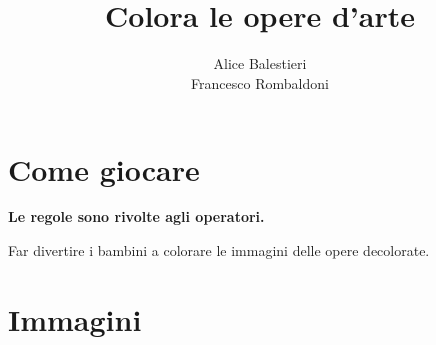 \documentclass[hidelinks,12pt,a4paper]{article}
\begin{document}
	
	\title{\textbf{\\Colora le opere d'arte}}
	\author{Alice Balestieri\\Francesco Rombaldoni}
	\date{}
	
	\maketitle
	\newpage
	
	\tableofcontents
	\newpage
	
	\section{Come giocare}
	\begin{center}
		\textbf{Le regole sono rivolte agli operatori.}
	\end{center}
	
	Far divertire i bambini a colorare le immagini delle opere decolorate.
	
	\section{Immagini}
	\newpage
	
\end{document}
